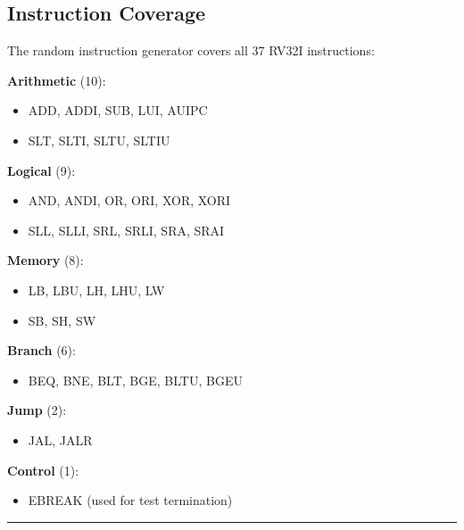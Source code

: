\subsection{Instruction Coverage}\label{cr:status:random-tests-status:instruction-coverage}

\begin{record}

The random instruction generator covers all 37 RV32I instructions:

\textbf{Arithmetic} (10):

\begin{itemize}
\tightlist
\item
  ADD, ADDI, SUB, LUI, AUIPC
\item
  SLT, SLTI, SLTU, SLTIU
\end{itemize}

\textbf{Logical} (9):

\begin{itemize}
\tightlist
\item
  AND, ANDI, OR, ORI, XOR, XORI
\item
  SLL, SLLI, SRL, SRLI, SRA, SRAI
\end{itemize}

\textbf{Memory} (8):

\begin{itemize}
\tightlist
\item
  LB, LBU, LH, LHU, LW
\item
  SB, SH, SW
\end{itemize}

\textbf{Branch} (6):

\begin{itemize}
\tightlist
\item
  BEQ, BNE, BLT, BGE, BLTU, BGEU
\end{itemize}

\textbf{Jump} (2):

\begin{itemize}
\tightlist
\item
  JAL, JALR
\end{itemize}

\textbf{Control} (1):

\begin{itemize}
\tightlist
\item
  EBREAK (used for test termination)
\end{itemize}

\begin{center}\rule{0.5\linewidth}{0.5pt}\end{center}

\end{record}

